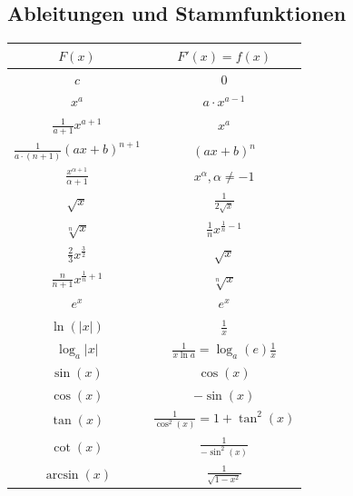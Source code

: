 \documentclass[a4paper,8pt]{extarticle}
\renewcommand*{\arraystretch}{2}
\begin{document}
\subsection{Ableitungen und Stammfunktionen}

\renewcommand\arraystretch{2}

\begin{center}
        \begin{tabular}{|c|c|}
          \hline
                $F(x)$ & $F'(x) = f(x)$ \\
                \hline \hline
                
                $ c $ & $ 0 $ \\
                \hline
	        $ x^a $ & $ a \cdot x^{a - 1} $ \\
          \hline
                $ \frac{1}{a+1} x^{a+1} $ & $ x^a $ \\
                \hline
                $ \frac{1}{a\cdot(n+1)} (ax+b)^{n+1} $ & $ (ax+b)^n $ \\
                \hline
	        $ \frac{x^{\alpha+1}}{\alpha + 1} $ & $ x^\alpha, \alpha \neq -1 $ \\
          \hline
                $ \sqrt x $ & $ \frac{1}{2 \sqrt x} $ \\
                \hline
                $ \sqrt[n] x $ & $ \frac{1}{n} {x}^{ \frac{1}{n} -1 } $ \\
                \hline
                $ \frac{2}{3} x^{ \frac{3}{2} } $ & $ \sqrt x $ \\
                \hline
                $ \frac{n}{n+1} x^{ \frac{1}{n}+1 } $ & $ \sqrt[n] x $ \\
                \hline
	        $ e^x $ & $ e^x $ \\
          \hline
	        $ \ln(|x|) $ & $ \frac{1}{x} $ \\
          \hline
                $ \log_a |x| $  &  $ \frac{1}{x \ln a} = \log_a(e) \frac{1}{x} $ \\
                \hline
	        $ \sin(x) $ & $ \cos(x) $ \\
          \hline
	        $ \cos(x) $ & $ -\sin(x) $ \\
          \hline
	        $ \tan(x) $ & $ \frac{1}{\cos^2(x)} = 1 + \tan^2(x) $ \\
          \hline
	        $ \cot(x) $ & $ \frac{1}{-\sin^2(x)} $ \\
          \hline
	        $ \arcsin(x) $ & $ \frac{1}{\sqrt{1 - x^2}} $ \\
          \hline

\end{tabular}
\end{center}
\end{document}
